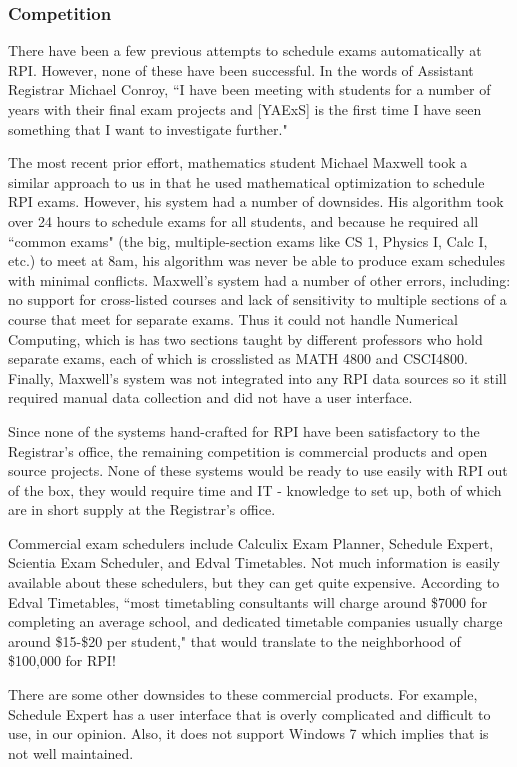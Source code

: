 \documentclass[11pt]{article}
\begin{document}
\subsubsection*{Competition}
There have been a few previous attempts to schedule exams automatically at RPI. However, none of these have been successful.  In the words of Assistant Registrar Michael Conroy,  ``I have been meeting with students for a number of years with their final exam projects and [YAExS] is the first time I have seen something that I want to investigate further."

The most recent prior effort,  mathematics student Michael Maxwell took a similar approach to us in that he used mathematical optimization to schedule RPI exams.
However, his system had a number of downsides.
His algorithm took over 24 hours to  schedule exams for all students, and because he required all ``common exams" (the big, multiple-section exams like CS 1, Physics I, Calc I, etc.) to meet at 8am, his algorithm was never be able to produce exam schedules with minimal conflicts.
Maxwell's system had a number of other errors, including: no support for cross-listed courses and lack of sensitivity to multiple sections of a course that meet for separate exams. Thus it could not handle Numerical Computing, which is has two sections taught by different professors who hold separate exams, each of which is crosslisted as MATH 4800 and CSCI4800.
Finally, Maxwell's system was not integrated into any RPI data sources so it still required manual data collection and did not have a user interface.

Since none of the systems hand-crafted for RPI have been satisfactory to the Registrar's office, the remaining competition is commercial products and open source projects.
None of these systems would be ready to use easily with RPI out of the box, they would require time and IT - knowledge to set up, both of which are in short supply at the Registrar's office.

Commercial exam schedulers include Calculix Exam Planner, Schedule Expert, Scientia Exam Scheduler, and Edval Timetables. Not much information is easily available about these schedulers, but they can get quite expensive.
According to Edval Timetables, ``most timetabling consultants will charge around \$7000 for completing an average school, and dedicated timetable companies usually charge around \$15-\$20 per student," that would translate to the neighborhood of \$100,000 for RPI!

There are some other downsides to these commercial products.
For example, Schedule Expert has a user interface that is overly complicated and difficult to use, in our opinion.
Also, it does not support Windows 7 which implies that is not well maintained.
\end{document}
